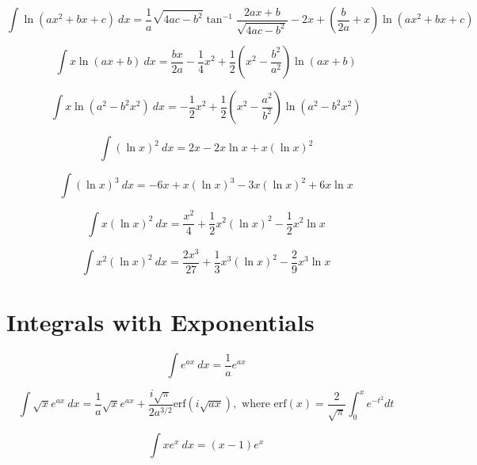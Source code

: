 \documentclass[12pt,letterpaper,leqno]{article}
\begin{document}
\begin{equation}
\int \ln \left ( ax^2 + bx + c\right) \ dx  = \frac{1}{a}\sqrt{4ac-b^2}\tan^{-1}\frac{2ax+b}{\sqrt{4ac-b^2}}
-2x + \left( \frac{b}{2a}+x \right )\ln \left (ax^2+bx+c \right) 
\end{equation}

\begin{equation}
\int x \ln (ax + b)\ dx = \frac{bx}{2a}-\frac{1}{4}x^2 
+\frac{1}{2}\left(x^2-\frac{b^2}{a^2}\right)\ln (ax+b) 
\end{equation}

\begin{equation}
\int x \ln \left ( a^2 - b^2 x^2 \right )\ dx = -\frac{1}{2}x^2+ 
\frac{1}{2}\left( x^2 - \frac{a^2}{b^2} \right ) \ln \left (a^2 -b^2 x^2 \right) 
\end{equation}

\begin{equation}
\int (\ln x)^2\ dx = 2x - 2x \ln x + x (\ln x)^2
\end{equation}


\begin{equation}
\int (\ln x)^3\ dx = -6 x+x (\ln x)^3-3 x (\ln x)^2+6 x \ln x
\end{equation}
 
 
\begin{equation}
\int x (\ln x)^2\ dx = \frac{x^2}{4}+\frac{1}{2} x^2 (\ln x)^2-\frac{1}{2} x^2 \ln x
\end{equation}

\begin{equation}
\int x^2 (\ln x)^2\ dx = \frac{2 x^3}{27}+\frac{1}{3} x^3 (\ln x)^2-\frac{2}{9} x^3 \ln x
\end{equation}
 
 
 \section*{Integrals with Exponentials}

\begin{equation}
\int e^{ax}\ dx = \frac{1}{a}e^{ax} 
\end{equation}

\begin{equation}\label{eq:ajoy}
\int \sqrt{x} e^{ax}\ dx = \frac{1}{a}\sqrt{x}e^{ax} 
+\frac{i\sqrt{\pi}}{2a^{3/2}}
\text{erf}\left(i\sqrt{ax}\right),
\text{ where erf}(x)=\frac{2}{\sqrt{\pi}}\int_0^x e^{-t^2}dt
\end{equation}

\begin{equation}
\int x e^x\ dx = (x-1) e^x 
\end{equation}
\end{document}
